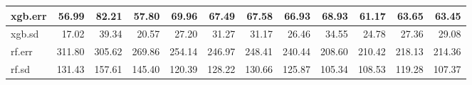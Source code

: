 \documentclass[11pt a4paper]{article}
\begin{document}
\begin{table}[H]
\begin{tabular}{|l|r|r|r|r|r|r|r|r|r|r|r|}
			xgb.err   & 56.99  & 82.21   & 57.80  & 69.96  & 67.49  & 67.58  & 66.93  & 68.93  & 61.17  & 63.65  & 63.45  \\ \hline
			xgb.sd    & 17.02  & 39.34   & 20.57  & 27.20  & 31.27  & 31.17  & 26.46  & 34.55  & 24.78  & 27.36  & 29.08  \\ \hline
			rf.err    & 311.80 & 305.62  & 269.86 & 254.14 & 246.97 & 248.41 & 240.44 & 208.60 & 210.42 & 218.13 & 214.36 \\ \hline
			rf.sd     & 131.43 & 157.61  & 145.40 & 120.39 & 128.22 & 130.66 & 125.87 & 105.34 & 108.53 & 119.28 & 107.37 \\ \hline
		\end{tabular}
		\label{table:model_comparison}
	\end{table}
	
	
	
\end{document}
